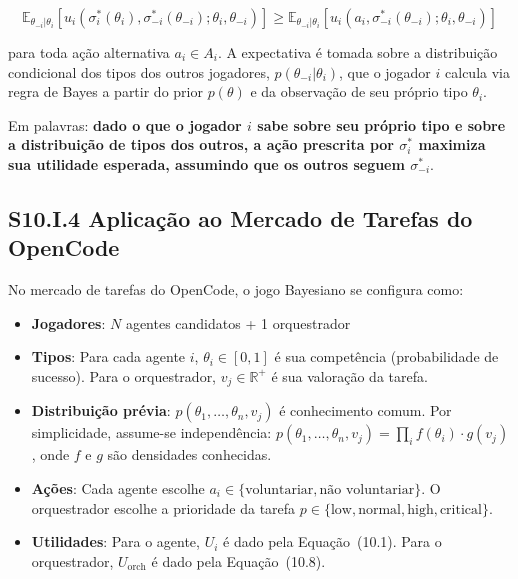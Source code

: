 \begin{equation}\label{eq:ebn_formal}
\mathbb{E}_{\theta_{-i}|\theta_i}\left[u_i(\sigma_i^*(\theta_i), \sigma_{-i}^*(\theta_{-i}); \theta_i, \theta_{-i})\right] \geq \mathbb{E}_{\theta_{-i}|\theta_i}\left[u_i(a_i, \sigma_{-i}^*(\theta_{-i}); \theta_i, \theta_{-i})\right]
\end{equation}

para toda ação alternativa $a_i \in A_i$. A expectativa é tomada sobre a distribuição condicional dos tipos dos outros jogadores, $p(\theta_{-i} | \theta_i)$, que o jogador $i$ calcula via regra de Bayes a partir do prior $p(\theta)$ e da observação de seu próprio tipo $\theta_i$.

Em palavras: \textbf{dado o que o jogador $i$ sabe sobre seu próprio tipo e sobre a distribuição de tipos dos outros, a ação prescrita por $\sigma_i^*$ maximiza sua utilidade esperada, assumindo que os outros seguem $\sigma_{-i}^*$}.

\subsection*{S10.I.4 Aplicação ao Mercado de Tarefas do OpenCode}

No mercado de tarefas do OpenCode, o jogo Bayesiano se configura como:

\begin{itemize}
    \item \textbf{Jogadores}: $N$ agentes candidatos + 1 orquestrador
    \item \textbf{Tipos}: Para cada agente $i$, $\theta_i \in [0,1]$ é sua competência (probabilidade de sucesso). Para o orquestrador, $v_j \in \mathbb{R}^+$ é sua valoração da tarefa.
    \item \textbf{Distribuição prévia}: $p(\theta_1, \ldots, \theta_n, v_j)$ é conhecimento comum. Por simplicidade, assume-se independência: $p(\theta_1, \ldots, \theta_n, v_j) = \prod_i f(\theta_i) \cdot g(v_j)$, onde $f$ e $g$ são densidades conhecidas.
    \item \textbf{Ações}: Cada agente escolhe $a_i \in \{\text{voluntariar}, \text{não voluntariar}\}$. O orquestrador escolhe a prioridade da tarefa $p \in \{\text{low}, \text{normal}, \text{high}, \text{critical}\}$.
    \item \textbf{Utilidades}: Para o agente, $U_i$ é dado pela Equação~(10.1). Para o orquestrador, $U_{\text{orch}}$ é dado pela Equação~(10.8).
\end{itemize}


